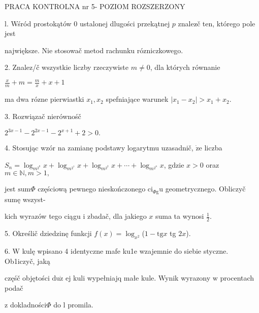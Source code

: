 \documentclass[a4paper,12pt]{article}
\begin{document}
PRACA KONTROLNA nr 5- POZIOM ROZSZERZONY

l. Wśród prostokątów $0$ ustalonej dlugości przekątnej $p$ znalez$\acute{}$č ten, którego pole jest

największe. Nie stosowač metod rachunku rózniczkowego.

2. Znalez/č wszystkie liczby rzeczywiste $m\neq 0$, dla których równanie

$\displaystyle \frac{x}{m}+m=\frac{m}{x}+x+1$

ma dwa rózne pierwiastki $x_{1}, x_{2}$ spefniające warunek $|x_{1}-x_{2}|>x_{1}+x_{2}.$

3. Rozwiązač nierównośč

$2^{3x-1}-2^{2x-1}-2^{x+1}+2>0.$

4. Stosując wzór na zamianę podstawy logarytmu uzasadnič, $\dot{\mathrm{z}}\mathrm{e}$ liczba

$S_{n}=\log_{m^{2^{0}}}x+\log_{m^{2^{1}}}x+\log_{m^{2^{2}}}x+\cdots+\log_{m^{2^{n}}}x$, gdzie $x>0$ oraz $m\in \mathbb{N}, m>1,$

jest $\mathrm{s}\mathrm{u}\mathrm{m}\Phi$ częściową pewnego nieskończonego $\mathrm{c}\mathrm{i}_{\Phi \mathrm{g}}\mathrm{u}$ geometrycznego. Obliczyč sumę wszyst-

kich wyrazów tego ciągu $\mathrm{i}$ zbadač, dla jakiego $x$ suma ta wynosi $\displaystyle \frac{1}{2}.$

5. Określič dziedzinę funkcji $f(x)=\log_{x^{2}}$($1-\mathrm{t}\mathrm{g}x$ tg $2x$).

6. $\mathrm{W}$ kulę wpisano 4 identyczne mafe ku1e wzajemnie do siebie styczne. Ob1iczyč, jaką

częśč objętości $\mathrm{d}\mathrm{u}\dot{\mathrm{z}}$ ej kuli wypełniajq małe kule. Wynik wyrazony $\mathrm{w}$ procentach podač

$\mathrm{z}$ dokladności$\Phi$ do l promila.
\end{document}
